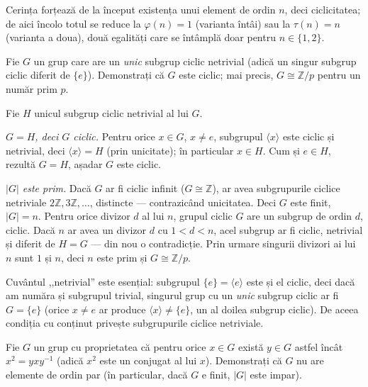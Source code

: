 \begin{obs}
Cerința forțează de la început existența unui element de
ordin $n$, deci ciclicitatea; de aici încolo totul se reduce la
$\varphi(n)=1$ (varianta întâi) sau la $\tau(n)=n$ (varianta a doua),
două egalități care se întâmplă doar pentru
$n\in\{1,2\}$.
\end{obs}

\begin{problema}
Fie $G$ un grup care are un \emph{unic} subgrup ciclic netrivial (adică
un singur subgrup ciclic diferit de $\{e\}$). Demonstrați că $G$
este ciclic; mai precis, $G\cong\mathbb{Z}/p$ pentru un număr prim $p$.
\end{problema}

\begin{solutie}
Fie $H$ unicul subgrup ciclic netrivial al lui $G$.

\smallskip
\textit{$G=H$, deci $G$ ciclic.} Pentru orice $x\in G$, $x\neq e$, subgrupul
$\langle x\rangle$ este ciclic și netrivial, deci $\langle x\rangle=H$
(prin unicitate); în particular $x\in H$. Cum și $e\in H$, rezultă
$G=H$, așadar $G$ este ciclic.

\smallskip
\textit{$|G|$ este prim.} Dacă $G$ ar fi ciclic infinit
($G\cong\mathbb{Z}$), ar avea subgrupurile ciclice netriviale
$2\mathbb{Z},3\mathbb{Z},\dots$, distincte --- contrazicând unicitatea.
Deci $G$ este finit, $|G|=n$. Pentru orice divizor $d$ al lui $n$, grupul
ciclic $G$ are un subgrup de ordin $d$, ciclic. Dacă $n$ ar avea un
divizor $d$ cu $1<d<n$, acel subgrup ar fi ciclic, netrivial și diferit
de $H=G$ --- din nou o contradicție. Prin urmare singurii divizori ai
lui $n$ sunt $1$ și $n$, deci $n$ este prim și $G\cong\mathbb{Z}/p$.
\end{solutie}

\begin{obs}
Cuvântul ,,netrivial'' este esențial: subgrupul
$\{e\}=\langle e\rangle$ este și el ciclic, deci dacă am număra
și subgrupul trivial, singurul grup cu un \emph{unic} subgrup ciclic ar
fi $G=\{e\}$ (orice $x\neq e$ ar produce $\langle x\rangle\neq\{e\}$, un al
doilea subgrup ciclic). De aceea condiția cu conținut privește
subgrupurile ciclice netriviale.
\end{obs}

\begin{problema}
Fie $G$ un grup cu proprietatea că pentru orice $x\in G$ există
$y\in G$ astfel încât $x^{2}=yxy^{-1}$ (adică $x^{2}$ este un
conjugat al lui $x$). Demonstrați că $G$ nu are elemente de ordin
par (în particular, dacă $G$ e finit, $|G|$ este impar).
\end{problema}


